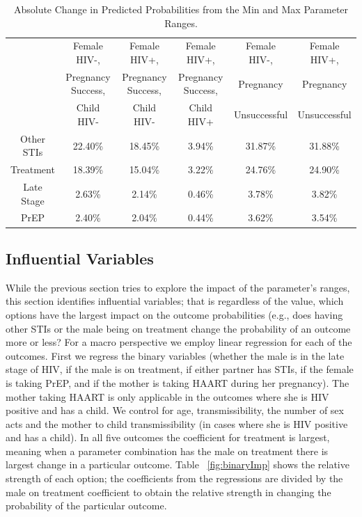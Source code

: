 \documentclass[11pt]{nih_mod}
\begin{document}
\begin{table}	
\begin{center}
\begin{tabular}{|c|c|c|c|c|c|}
\hline
 & Female HIV-,  & Female HIV+, & Female HIV+, & Female HIV-, & Female HIV+,\\ 
 & Pregnancy Success,& Pregnancy Success,&Pregnancy Success,& Pregnancy& Pregnancy\\ 
 & Child HIV-&Child HIV-&Child HIV+&Unsuccessful&Unsuccessful\\ 
\hline
\hline
Other STIs & 22.40\% & 18.45\% & 3.94\% & 31.87\% & 31.88\%\\ 
Treatment & 18.39\% & 15.04\% & 3.22\% & 24.76\% & 24.90\%\\ 
Late Stage & 2.63\% & 2.14\% & 0.46\% & 3.78\% & 3.82\%\\ 
PrEP & 2.40\% & 2.04\% & 0.44\% & 3.62\% & 3.54\%\\
\hline
\end{tabular}
	\caption{Absolute Change in Predicted Probabilities from the Min and Max Parameter Ranges. \label{tab:rangeImp}}
\end{center}
\end{table}


 \subsection{Influential Variables}
While the previous section tries to explore the impact of the parameter's ranges, this section identifies influential variables; that is regardless of the value, which options have the largest impact on the outcome probabilities (e.g., does having other STIs or the male being on treatment change the probability of an outcome more or less? For a macro perspective we employ linear regression for each of the outcomes.  First we regress the binary variables (whether the male is in the late stage of HIV, if the male is on treatment, if either partner has STIs, if the female is taking PrEP, and if the mother is taking HAART during her pregnancy).  The mother taking HAART is only applicable in the outcomes where she is HIV positive and has a child.  We control for age, transmissibility, the number of sex acts and the mother to child transmissibility (in cases where she is HIV positive and has a child).  In all five outcomes the coefficient for treatment is largest, meaning when a parameter combination has the male on treatment there is largest change in a particular outcome.  Table ~\ref{fig:binaryImp} shows the relative strength of each option; the coefficients from the regressions are divided by the male on treatment coefficient to obtain the relative strength in changing the probability of the particular outcome.   
\end{document}
